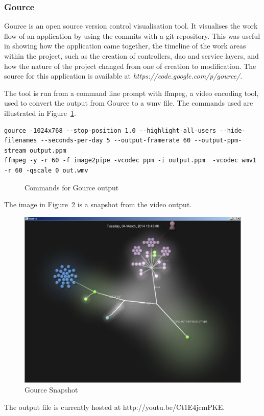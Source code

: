 \subsubsection{Gource}

Gource is an open source version control visualisation tool. It visualises the work flow of an application by using the commits with a git repository. This was useful in showing how the application came together, the timeline of the work areas within the project, such as the creation of controllers, dao and service layers, and how the nature of the project changed from one of creation to modification. The source for this application is available at \textit{https://code.google.com/p/gource/}.

The tool is run from a command line prompt with ffmpeg, a video encoding tool, used to convert the output from Gource to a wmv file. The commands used are illustrated in Figure~\ref{fig:gourcecmd}.
\newpage
\begin{lstlisting}
gource -1024x768 --stop-position 1.0 --highlight-all-users --hide-filenames --seconds-per-day 5 --output-framerate 60 --output-ppm-stream output.ppm
ffmpeg -y -r 60 -f image2pipe -vcodec ppm -i output.ppm  -vcodec wmv1 -r 60 -qscale 0 out.wmv
\end{lstlisting}
\begin{figure}[H]
\caption{Commands for Gource output}
\label{fig:gourcecmd}
\end{figure}

The image in Figure~\ref{fig:gource} is a snapshot from the video output.

\begin{figure}[H]
\begin{center}
\includegraphics[scale=0.45]{gource.png}
\caption{Gource Snapshot}
\label{fig:gource}
\end{center}
\end{figure}

The output file is currently hosted at http://youtu.be/Ct1E4jcmPKE.

